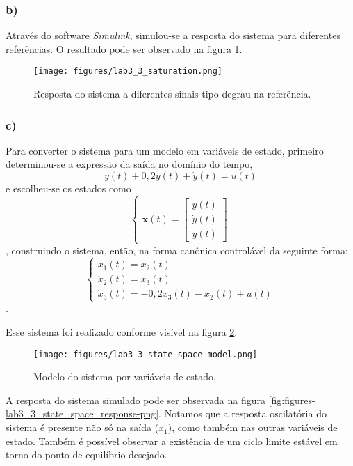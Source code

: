 \documentclass[a4paper]{report}
\begin{document}
\subsubsection*{b)}

Através do software \emph{Simulink}, simulou-se a resposta do sistema para diferentes referências. O resultado pode ser observado na figura \ref{fig:figures-lab3_3_saturation-png}.

\begin{figure}[H]
    \centering
    \texttt{[image: figures/lab3\_3\_saturation.png]}
    \caption{Resposta do sistema a diferentes sinais tipo degrau na referência.}
    \label{fig:figures-lab3_3_saturation-png}
\end{figure}

\subsubsection*{c)}

Para converter o sistema para um modelo em variáveis de estado, primeiro determinou-se a expressão da saída no domínio do tempo, \[
    \dddot{y}(t) + 0,2\ddot{y}(t) + \dot{y}(t) = u(t)
\] e escolheu-se os estados como \[
\begin{cases}
    \bm{x}(t) = \begin{bmatrix} y(t) \\ \dot{y}(t) \\ \ddot{y}(t) \end{bmatrix} 
\end{cases}
\], construindo o sistema, então, na forma canônica controlável da seguinte forma: \[
\begin{cases}
    \dot{x}_1(t) = x_2(t) \\
    \dot{x}_2(t) = x_3(t) \\
    \dot{x}_3(t) = -0,2x_3(t) - x_2(t) +u(t)
\end{cases}
\].

Esse sistema foi realizado conforme visível na figura \ref{fig:figures-lab3_3_state_space_model-png}.

\begin{figure}[H]
    \centering
    \texttt{[image: figures/lab3\_3\_state\_space\_model.png]}
    \caption{Modelo do sistema por variáveis de estado.}
    \label{fig:figures-lab3_3_state_space_model-png}
\end{figure}

A resposta do sistema simulado pode ser observada na figura \ref{fig:figures-lab3_3_state_space_response-png}. Notamos que a resposta oscilatória do sistema é presente não só na saída ($x_1$), como também nas outras variáveis de estado. Também é possível observar a existência de um ciclo limite estável em torno do ponto de equilíbrio desejado.
\end{document}
